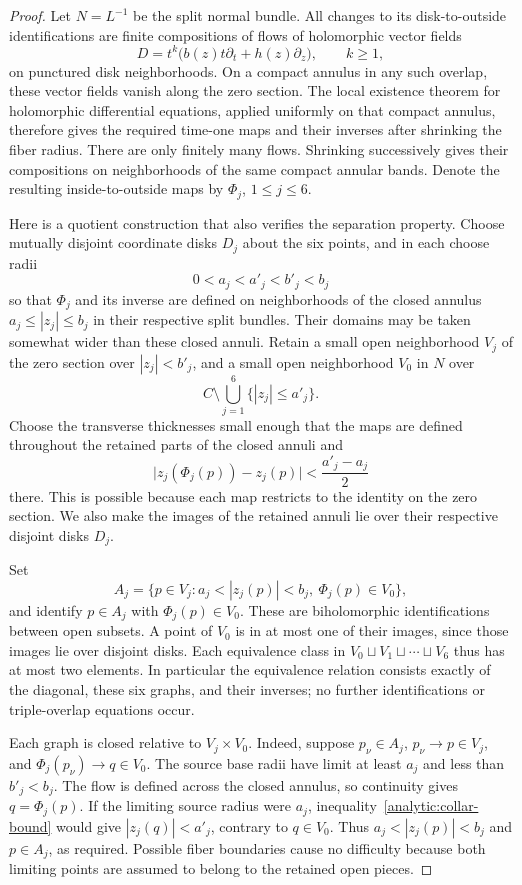 \begin{proof}
Let $N=L^{-1}$ be the split normal bundle.  All changes to its
disk-to-outside identifications are finite compositions of flows of
holomorphic vector fields
\[
 D=t^k\bigl(b(z)t\partial_t+h(z)\partial_z\bigr),\qquad k\geq1,
\]
on punctured disk neighborhoods.  On a compact annulus in any such
overlap, these vector fields vanish along the zero section.
The local existence theorem for holomorphic differential equations,
applied uniformly on that compact annulus, therefore gives the
required time-one maps and their inverses after shrinking the fiber
radius.  There are only finitely many flows.  Shrinking successively
gives their compositions on neighborhoods of the same compact
annular bands.  Denote the resulting inside-to-outside maps by
$\Phi_j$, $1\leq j\leq6$.

Here is a quotient construction that also verifies the separation
property.  Choose mutually disjoint coordinate disks $D_j$ about the
six points, and in each choose radii
\[
 0<a_j<a'_j<b'_j<b_j
\]
so that $\Phi_j$ and its inverse are defined on neighborhoods of the
closed annulus $a_j\leq |z_j|\leq b_j$ in their respective split
bundles.  Their domains may be taken somewhat wider than these closed
annuli.  Retain a small open neighborhood $V_j$ of the zero section
over $|z_j|<b'_j$, and a small open neighborhood $V_0$ in $N$ over
\[
 C\setminus\bigcup_{j=1}^6\{|z_j|\leq a'_j\}.
\]
Choose the transverse thicknesses small enough that the maps are
defined throughout the retained parts of the closed annuli and
\begin{equation}\label{analytic:collar-bound}
 \bigl|z_j(\Phi_j(p))-z_j(p)\bigr|
 <\frac{a'_j-a_j}{2}
\end{equation}
there.  This is possible because each map restricts to the identity
on the zero section.  We also make the images of the retained annuli
lie over their respective disjoint disks $D_j$.

Set
\[
 A_j=\{p\in V_j:a_j<|z_j(p)|<b_j,\ \Phi_j(p)\in V_0\},
\]
and identify $p\in A_j$ with $\Phi_j(p)\in V_0$.  These are
biholomorphic identifications between open subsets.  A point of
$V_0$ is in at most one of their images, since those images lie over
disjoint disks.  Each equivalence class in
$V_0\sqcup V_1\sqcup\cdots\sqcup V_6$ thus has at most two elements.
In particular the equivalence relation consists exactly of the
diagonal, these six graphs, and their inverses; no further
identifications or triple-overlap equations occur.

Each graph is closed relative to $V_j\times V_0$.  Indeed, suppose
$p_\nu\in A_j$, $p_\nu\to p\in V_j$, and
$\Phi_j(p_\nu)\to q\in V_0$.  The source base radii have limit at
least $a_j$ and less than $b'_j<b_j$.  The flow is defined across the
closed annulus, so continuity gives $q=\Phi_j(p)$.  If the limiting
source radius were $a_j$, inequality~\eqref{analytic:collar-bound}
would give $|z_j(q)|<a'_j$, contrary to $q\in V_0$.  Thus
$a_j<|z_j(p)|<b_j$ and $p\in A_j$, as required.  Possible fiber
boundaries cause no difficulty because both limiting points are
assumed to belong to the retained open pieces.


\end{proof}
